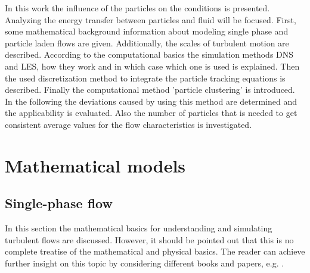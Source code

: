 \documentclass[11pt,a4paper,openany,oneside,parskip=half*]{article}
\begin{document}
In this work the influence of the particles on the conditions is presented. Analyzing the energy transfer between particles and fluid will be focused.  
\newline
First, some mathematical background information about modeling single phase and particle laden flows are given. 
Additionally, the scales of turbulent motion are described.
According to the computational basics the simulation methods DNS and LES, how they work and in which case which one is used is explained.
Then the used discretization method to integrate the particle tracking equations is described.     
Finally the computational method 'particle clustering' is introduced. 
In the following the deviations caused by using this method are determined and the applicability is evaluated.
Also the number of particles that is needed to get consistent average values for the flow characteristics is investigated.
\pagebreak
\section{Mathematical models}
\subsection{Single-phase flow} %
In this section the mathematical basics for understanding and simulating turbulent flows are discussed. However, it should be pointed out that this is no
complete treatise of the mathematical and physical basics. The reader can achieve further insight on this topic by considering different books and papers, 
e.g. \cite{turbulentFlows}.
\newline
\end{document}
